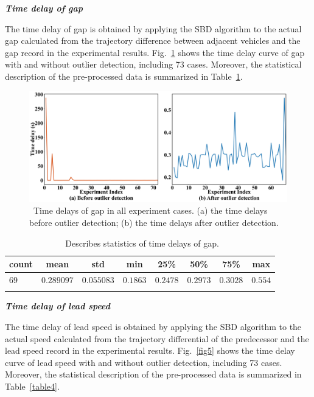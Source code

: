 \documentclass[a4paper]{cas-sc}
\begin{document}
\textbf{\emph{Time delay of gap}}

The time delay of gap is obtained by applying the SBD algorithm to the actual gap calculated from the trajectory difference between adjacent vehicles and the gap record in the experimental results. Fig.~\ref{fig4} shows the time delay curve of gap with and without outlier detection, including 73 cases. Moreover, the statistical description of the pre-processed data is summarized in Table~\ref{table3}.

\begin{figure}
  \centering
  \includegraphics[width=14cm]{figs/fig4.png}
  \caption{~Time delays of gap in all experiment cases. (a) the time delays before outlier detection; (b) the time delays after outlier detection.}
  \label{fig4}
\end{figure}

\begin{table}
  \centering
  \setlength{\abovecaptionskip}{0pt}
  \setlength{\belowcaptionskip}{10pt}%
  \caption{~Describes statistics of time delays of gap.}
  {\begin{tabular}{lccccccc} \toprule
      count & mean       & std        & min      & 25\%     & 50\%     & 75\%     & max     \\ \midrule
      $69$  & $0.289097$ & $0.055083$ & $0.1863$ & $0.2478$ & $0.2973$ & $0.3028$ & $0.554$ \\
      \bottomrule
      \label{table3}
    \end{tabular}}
\end{table}

\textbf{\emph{Time delay of lead speed}}

The time delay of lead speed is obtained by applying the SBD algorithm to the actual speed calculated from the trajectory differential of the predecessor and the lead speed record in the experimental results. Fig.~\ref{fig5} shows the time delay curve of lead speed with and without outlier detection, including 73 cases. Moreover, the statistical description of the pre-processed data is summarized in Table~\ref{table4}.
\end{document}
